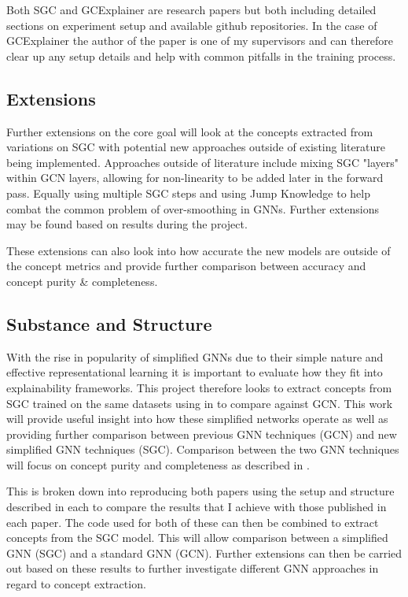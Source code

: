 Both SGC and GCExplainer are research papers but both including detailed sections on experiment setup and available github repositories. In the case of GCExplainer the author of the paper is one of my supervisors and can therefore clear up any setup details and help with common pitfalls in the training process.

\subsection{Extensions}

Further extensions on the core goal will look at the concepts extracted from variations on SGC with potential new approaches outside of existing literature being implemented. Approaches outside of literature include mixing SGC "layers" within GCN layers, allowing for non-linearity to be added later in the forward pass. Equally using multiple SGC steps and using Jump Knowledge \cite{xu2018representation} to help combat the common problem of over-smoothing in GNNs. Further extensions may be found based on results during the project.

These extensions can also look into how accurate the new models are outside of the concept metrics and provide further comparison between accuracy and concept purity \& completeness.

\subsection{Substance and Structure}

With the rise in popularity of simplified GNNs due to their simple nature and effective representational learning it is important to evaluate how they fit into explainability frameworks. This project therefore looks to extract concepts from SGC trained on the same datasets using in \cite{magister2021gcexplainer} to compare against GCN. This work will provide useful insight into how these simplified networks operate as well as providing further comparison between previous GNN techniques (GCN) and new simplified GNN techniques (SGC). Comparison between the two GNN techniques will focus on concept purity and completeness as described in \cite{magister2021gcexplainer}.

This is broken down into reproducing both papers using the setup and structure described in each to compare the results that I achieve with those published in each paper. The code used for both of these can then be combined to extract concepts from the SGC model. This will allow comparison between a simplified GNN (SGC) and a standard GNN (GCN). Further extensions can then be carried out based on these results to further investigate different GNN approaches in regard to concept extraction. 

